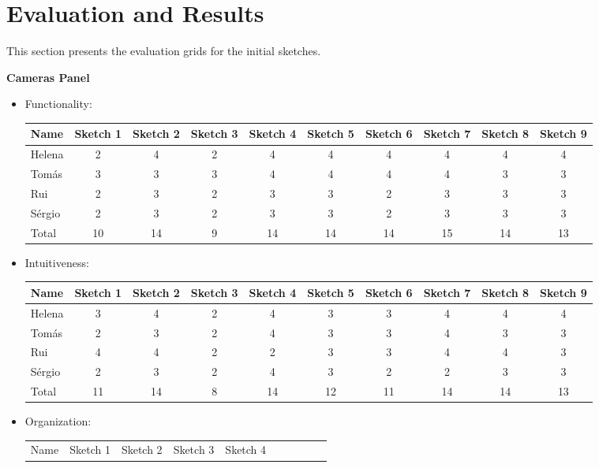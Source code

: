 \section{Evaluation and Results}
This section presents the evaluation grids for the initial sketches. \par
\textbf{Cameras Panel}
\begin{itemize}
    \item Functionality: 
\begin{center}
\begin{table}[H]
\begin{tabular}{l*{9}{c}}
Name & Sketch 1 & Sketch 2 & Sketch 3 & Sketch 4 
& Sketch 5 & Sketch 6 & Sketch 7 & Sketch 8 & Sketch 9 \\
\hline 
Helena & 2 & 4 & 2 & 4 & 4 & 4 & 4 & 4 & 4 \\
Tomás & 3 & 3 & 3 & 4 & 4 & 4 & 4 & 3 & 3 \\ 
Rui & 2 & 3 & 2 & 3 & 3 & 2 & 3 & 3 & 3 \\ 
Sérgio & 2 & 3 & 2 & 3 & 3 & 2 & 3 & 3 & 3 \\ 
\hline
Total & 10 & 14 & 9 & 14 & 14 & 14 & 15 & 14 & 13 \\
\end{tabular}
\end{table}
\end{center}
\item Intuitiveness: 
\begin{table}[H]
\begin{tabular}{l*{9}{c}}
    Name & Sketch 1 & Sketch 2 & Sketch 3 & Sketch 4 
    & Sketch 5 & Sketch 6 & Sketch 7 & Sketch 8 & Sketch 9 \\
    \hline 
    Helena & 3 & 4 & 2 & 4 & 3 & 3 & 4 & 4 & 4 \\
    Tomás & 2 & 3 & 2 & 4 & 3 & 3 & 4 & 3 & 3 \\ 
    Rui & 4 & 4 & 2 & 2 & 3 & 3 & 4 & 4 & 3 \\ 
    Sérgio & 2 & 3 & 2 & 4 & 3 & 2 & 2 & 3 & 3 \\ 
    \hline
    Total & 11 & 14 & 8 & 14 & 12 & 11 & 14 & 14 & 13 \\
\end{tabular}
\end{table}
\item Organization:
\begin{table}[H]
    \begin{tabular}{l*{9}{c}}
        Name & Sketch 1 & Sketch 2 & Sketch 3 & Sketch 4 

\end{tabular}
\end{table}
\end{itemize}
